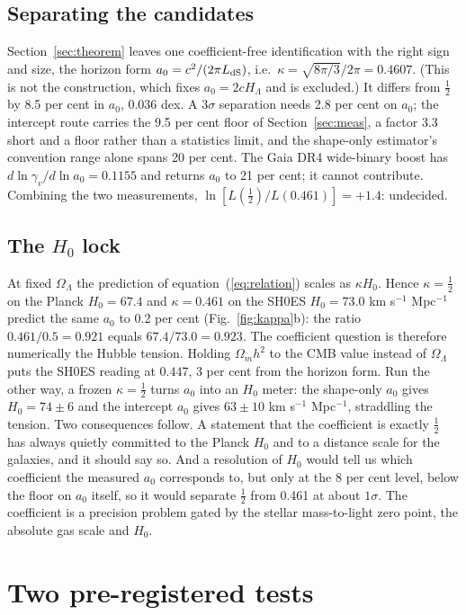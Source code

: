 \documentclass[fleqn,usenatbib]{mnras}
\begin{document}
\subsection{Separating the candidates}
Section~\ref{sec:theorem} leaves one coefficient-free identification with the right sign and size, the horizon form $a_0=c^2/(2\pi L_{\rm dS})$, i.e.\ $\kappa=\sqrt{8\pi/3}/2\pi=0.4607$. (This is not the \citet{Milgrom1999} construction, which fixes $a_0=2cH_\Lambda$ and is excluded.) It differs from $\tfrac12$ by 8.5 per cent in $a_0$, $0.036$ dex. A $3\sigma$ separation needs 2.8 per cent on $a_0$; the intercept route carries the 9.5 per cent floor of Section~\ref{sec:meas}, a factor 3.3 short and a floor rather than a statistics limit, and the shape-only estimator's convention range alone spans 20 per cent. The Gaia DR4 wide-binary boost has $d\ln\gamma_v/d\ln a_0=0.1155$ and returns $a_0$ to 21 per cent; it cannot contribute. Combining the two measurements, $\ln[L(\tfrac12)/L(0.461)]=+1.4$: undecided.

\subsection{The $H_0$ lock}
At fixed $\Omega_\Lambda$ the prediction of equation~(\ref{eq:relation}) scales as $\kappa H_0$. Hence $\kappa=\tfrac12$ on the Planck $H_0=67.4$ and $\kappa=0.461$ on the SH0ES $H_0=73.0$ km s$^{-1}$ Mpc$^{-1}$ \citep{Riess2022} predict the same $a_0$ to 0.2 per cent (Fig.~\ref{fig:kappa}b): the ratio $0.461/0.5=0.921$ equals $67.4/73.0=0.923$. The coefficient question is therefore numerically the Hubble tension. Holding $\Omega_mh^2$ to the CMB value instead of $\Omega_\Lambda$ puts the SH0ES reading at $0.447$, 3 per cent from the horizon form. Run the other way, a frozen $\kappa=\tfrac12$ turns $a_0$ into an $H_0$ meter: the shape-only $a_0$ gives $H_0=74\pm6$ and the intercept $a_0$ gives $63\pm10$ km s$^{-1}$ Mpc$^{-1}$, straddling the tension. Two consequences follow. A statement that the coefficient is exactly $\tfrac12$ has always quietly committed to the Planck $H_0$ and to a distance scale for the galaxies, and it should say so. And a resolution of $H_0$ would tell us which coefficient the measured $a_0$ corresponds to, but only at the 8 per cent level, below the floor on $a_0$ itself, so it would separate $\tfrac12$ from 0.461 at about $1\sigma$. The coefficient is a precision problem gated by the stellar mass-to-light zero point, the absolute gas scale and $H_0$.

\section{Two pre-registered tests}
\label{sec:tests}
\end{document}
